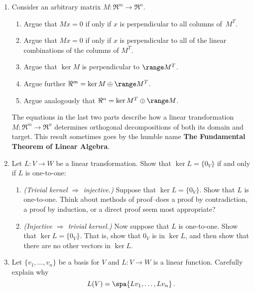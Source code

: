 


\begin{enumerate}

\item 
Consider an arbitrary matrix $M:\Re^m\to \Re^n.$
\begin{enumerate}
\item Argue that $Mx=0$ if only if $x$ is perpendicular to all columns of~$M^T$.
\item Argue that $Mx=0$ if only if $x$ is perpendicular to all of the linear combinations of the columns of $M^T$.
\item Argue that $\ker M$ is perpendicular to $\range M^T$. 
\item Argue further $\Re^m=\ker M \oplus \range M^T$. 
\item Argue analogously that $\Re^n=\ker M^T \oplus \range M$. 
\end{enumerate} 
The equations in the last two parts describe how a linear transformation $M:\Re^m\to \Re^n$ determines orthogonal decompositions of both its domain and target. This result sometimes goes by the humble name {\bf{The Fundamental Theorem of Linear Algebra}}.




\item \label{injectivekernalprob} Let $L \colon V\rightarrow W$ be a linear transformation.  Show that $\ker L=\{0_V\}$ if and only if $L$ is one-to-one:
\begin{enumerate}
\item {\itshape (Trivial kernel $\Rightarrow$ injective.)} Suppose that \(\ker L=\{0_V\}\). Show that \(L\) is one-to-one. Think about methods of proof--does a proof by contradiction, a proof by induction, or a direct proof seem most appropriate?
\item {\itshape (Injective $\Rightarrow$ trivial kernel.)} Now suppose that \(L\) is one-to-one. Show that \(\ker L=\{0_V\}\). That is, show that \(0_V\) is in \(\ker L\), and then show that there are no other vectors in \(\ker L\).
\end{enumerate}

\item Let $\{v_1, \ldots, v_n  \}$ be a basis for $V$ and $L:V\to W$ is a linear function. Carefully explain why
\[
L(V)=\spa \{Lv_1, \ldots, Lv_n \}\, .
\]



\end{enumerate}
